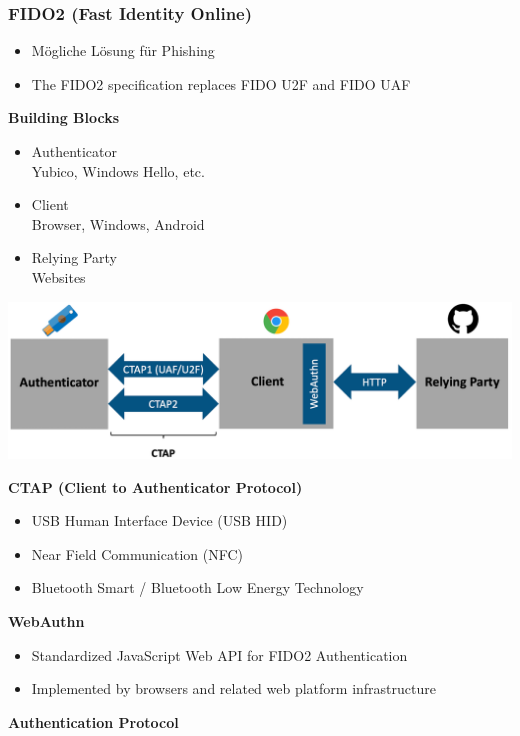 \subsubsection{FIDO2 (Fast Identity Online)}
\begin{itemize}
    \item Mögliche Lösung für Phishing
    \item The FIDO2 specification replaces FIDO U2F and FIDO UAF
\end{itemize}
\textbf{Building Blocks}
\begin{itemize}
    \item Authenticator\\
    Yubico, Windows Hello, etc.
    \item Client\\
    Browser, Windows, Android
    \item Relying Party\\
    Websites
\end{itemize}
\begin{center}
    \vspace{-8pt}
    \includegraphics[width=1.0\linewidth]{./img/09-mitm/fido2_building_blocks}
    \vspace{-8pt}
\end{center}
\textbf{CTAP (Client to Authenticator Protocol)}
\begin{itemize}
    \item USB Human Interface Device (USB HID)
    \item Near Field Communication (NFC)
    \item Bluetooth Smart / Bluetooth Low Energy Technology
\end{itemize}
\textbf{WebAuthn}
\begin{itemize}
    \item Standardized JavaScript Web API for FIDO2 Authentication
    \item Implemented by browsers and related web platform infrastructure
\end{itemize}
\textbf{Authentication Protocol}

